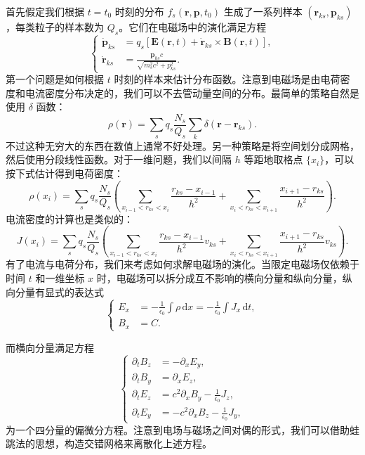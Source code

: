 首先假定我们根据 $t=t_0$ 时刻的分布 $f_s(\mathbf r,\mathbf p,t_0)$ 生成了一系列样本 $(\mathbf r_{ks},\mathbf p_{ks})$，每类粒子的样本数为 $Q_s$。它们在电磁场中的演化满足方程
\begin{equation}
\left\{
\begin{aligned}
\dot{\mathbf p}_{ks}&=q_s[\mathbf E(\mathbf r,t)+\dot{\mathbf r}_{ks}\times\mathbf B(\mathbf r,t)],\\
\dot{\mathbf r}_{ks}&=\frac{\mathbf p_{ks}c}{\sqrt{m_s^2c^2+p_{ks}^2}}.
\end{aligned}
\right.
\tag{7.5.7}
\end{equation}
第一个问题是如何根据 $t$ 时刻的样本来估计分布函数。注意到电磁场是由电荷密度和电流密度分布决定的，我们可以不去管动量空间的分布。最简单的策略自然是使用 $\delta$ 函数：
\begin{equation}
\rho(\mathbf r)=\sum_s q_s\frac{N_s}{Q_s}\sum_k\delta(\mathbf r-\mathbf r_{ks}).
\tag{7.5.8}
\end{equation}
不过这种无穷大的东西在数值上通常不好处理。另一种策略是将空间划分成网格，然后使用分段线性函数。对于一维问题，我们以间隔 $h$ 等距地取格点 $\{x_i\}$，可以按下式估计得到电荷密度：
\begin{equation}
\rho(x_i)=\sum_s q_s\frac{N_s}{Q_s}\left(\sum_{x_{i-1}<r_{ks}<x_i}\frac{r_{ks}-x_{i-1}}{h^2}+\sum_{x_i<r_{ks}<x_{i+1}}\frac{x_{i+1}-r_{ks}}{h^2}\right).
\tag{7.5.9}
\end{equation}
电流密度的计算也是类似的：
\begin{equation}
J(x_i)=\sum_s q_s\frac{N_s}{Q_s}\left(\sum_{x_{i-1}<r_{ks}<x_i}\frac{r_{ks}-x_{i-1}}{h^2}v_{ks}+\sum_{x_i<r_{ks}<x_{i+1}}\frac{x_{i+1}-r_{ks}}{h^2}v_{ks}\right).
\tag{7.5.10}
\end{equation}
有了电流与电荷分布，我们来考虑如何求解电磁场的演化。当限定电磁场仅依赖于时间 $t$ 和一维坐标 $x$ 时，电磁场可以拆分成互不影响的横向分量和纵向分量，纵向分量有显式的表达式
\begin{equation}
\left\{
\begin{aligned}
E_x&=-\frac1{\epsilon_0}\int \rho\,\mathrm dx=-\frac1{\epsilon_0}\int J_x\,\mathrm dt,\\
B_x&=C.
\end{aligned}
\right.
\tag{7.5.11}
\end{equation}

而横向分量满足方程
\begin{equation}
\left\{
\begin{aligned}
\partial_t B_z&=-\partial_x E_y,\\
\partial_t B_y&=\partial_x E_z,\\
\partial_t E_z&=c^2\partial_x B_y-\frac1{\epsilon_0}J_z,\\
\partial_t E_y&=-c^2\partial_x B_z-\frac1{\epsilon_0}J_y,
\end{aligned}
\right.
\tag{7.5.12}
\end{equation}
为一个四分量的偏微分方程。注意到电场与磁场之间对偶的形式，我们可以借助蛙跳法的思想，构造交错网格来离散化上述方程。

